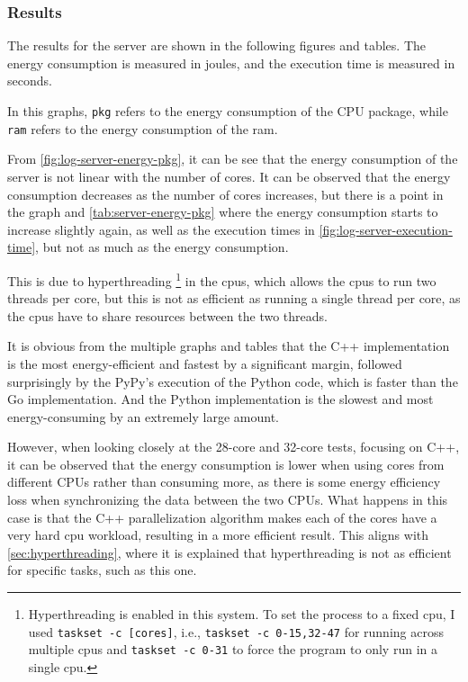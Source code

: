 \subsubsection{Results}

\newlength{\plotwidthgraph}
\newlength{\plotheightgraph}
\setlength{\plotwidthgraph}{14cm}
\setlength{\plotheightgraph}{8cm}

The results for the server are shown in the following figures and tables. The energy consumption is measured in joules, and the execution time is measured in seconds. 

In this graphs, \texttt{pkg} refers to the energy consumption of the CPU package, while \texttt{ram} refers to the energy consumption of the \gls{ram}.







From \autoref{fig:log-server-energy-pkg}, it can be see that the energy consumption of the server is not linear with the number of cores. It can be observed that the energy consumption decreases as the number of cores increases, but there is a point in the graph and \autoref{tab:server-energy-pkg} where the energy consumption starts to increase slightly again, as well as the execution times in \autoref{fig:log-server-execution-time}, but not as much as the energy consumption.

This is due to hyperthreading \footnote{Hyperthreading is enabled in this system. To set the process to a fixed \gls{cpu}, I used \texttt{taskset -c [cores]}, i.e., \texttt{taskset -c 0-15,32-47} for running across multiple \glspl{cpu} and \texttt{taskset -c 0-31} to force the program to only run in a single \gls{cpu}.} in the \glspl{cpu}, which allows the \glspl{cpu} to run two threads per core, but this is not as efficient as running a single thread per core, as the \glspl{cpu} have to share resources between the two threads.

It is obvious from the multiple graphs and tables that the C++ implementation is the most energy-efficient and fastest by a significant margin, followed surprisingly by the PyPy's execution of the Python code, which is faster than the Go implementation. And the Python implementation is the slowest and most energy-consuming by an extremely large amount.

However, when looking closely at the 28-core and 32-core tests, focusing on C++, it can be observed that the energy consumption is lower when using cores from different CPUs rather than consuming more, as there is some energy efficiency loss when synchronizing the data between the two CPUs. What happens in this case is that the C++ parallelization algorithm makes each of the cores have a very hard \gls{cpu} workload, resulting in a more efficient result. This aligns with \autoref{sec:hyperthreading}, where it is explained that hyperthreading is not as efficient for specific tasks, such as this one.


